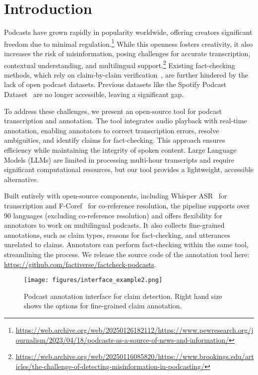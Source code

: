 \section{Introduction}


Podcasts have grown rapidly in popularity worldwide, offering creators significant freedom due to minimal regulation.\footnote{\url{https://web.archive.org/web/20250126182112/https://www.pewresearch.org/journalism/2023/04/18/podcasts-as-a-source-of-news-and-information/}} While this openness fosters creativity, it also increases the risk of misinformation, posing challenges for accurate transcription, contextual understanding, and multilingual support.\footnote{\url{https://web.archive.org/web/20250116085820/https://www.brookings.edu/articles/the-challenge-of-detecting-misinformation-in-podcasting/}} Existing fact-checking methods, which rely on claim-by-claim verification~\cite{thorne-etal-2018-fever,schlichtkrull2023averitec}, are further hindered by the lack of open podcast datasets. Previous datasets like the Spotify Podcast Dataset~\cite{clifton2020100} are no longer accessible, leaving a significant gap.

To address these challenges, we present an open-source tool for podcast transcription and annotation. The tool integrates audio playback with real-time annotation, enabling annotators to correct transcription errors, resolve ambiguities, and identify claims for fact-checking. This approach ensures efficiency while maintaining the integrity of spoken content. Large Language Models (LLMs) are limited in processing multi-hour transcripts and require significant computational resources, but our tool provides a lightweight, accessible alternative.

Built entirely with open-source components, including Whisper ASR~\cite{radford2023robust} for transcription and F-Coref~\cite{otmazgin2022f} for co-reference resolution, the pipeline supports over 90 languages (excluding co-reference resolution) and offers flexibility for annotators to work on multilingual podcasts. It also collects fine-grained annotations, such as claim types, reasons for fact-checking, and utterances unrelated to claims. Annotators can perform fact-checking within the same tool, streamlining the process. We release the source code of the annotation tool here: \url{https://github.com/factiverse/factcheck-podcasts}.


\begin{figure*}[h!]
    \centering
    \texttt{[image: figures/interface\_example2.png]}
    \caption{Podcast annotation interface for claim detection. Right hand size shows the options for fine-grained claim annotation.}
    \label{fig:claims}
\end{figure*}

